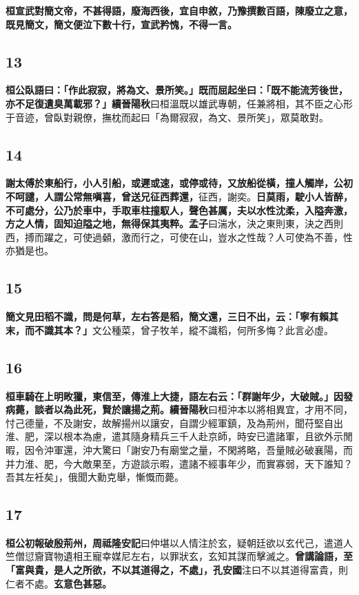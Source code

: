 \textbf{桓宣武對簡文帝，不甚得語，廢海西後，宜自申敘，乃豫撰數百語，陳廢立之意，既見簡文，簡文便泣下數十行，宣武矜愧，不得一言。}

\subsection*{13}

\textbf{桓公臥語曰：「作此寂寂，將為文、景所笑。」既而屈起坐曰：「既不能流芳後世，亦不足復遺臭萬載邪？」}{\footnotesize \textbf{續晉陽秋}曰桓溫既以雄武專朝，任兼將相，其不臣之心形于音迹，曾臥對親僚，撫枕而起曰「為爾寂寂，為文、景所笑」，眾莫敢對。}

\subsection*{14}

\textbf{謝太傅於東船行，小人引船，或遲或速，或停或待，又放船從橫，撞人觸岸，公初不呵譴，人謂公常無嗔喜，曾送兄征西葬還，}{\footnotesize 征西，謝奕。}\textbf{日莫雨，駛小人皆醉，不可處分，公乃於車中，手取車柱撞馭人，聲色甚厲，夫以水性沈柔，入隘奔激，方之人情，固知迫隘之地，無得保其夷粹。}{\footnotesize \textbf{孟子}曰湍水，決之東則東，決之西則西，搏而躍之，可使過顙，激而行之，可使在山，豈水之性哉？人可使為不善，性亦猶是也。}

\subsection*{15}

\textbf{簡文見田稻不識，問是何草，左右答是稻，簡文還，三日不出，云：「寧有賴其末，而不識其本？」}{\footnotesize 文公種菜，曾子牧羊，縱不識稻，何所多悔？此言必虛。}

\subsection*{16}

\textbf{桓車騎在上明畋獵，東信至，傳淮上大捷，語左右云：「群謝年少，大破賊。」因發病薨，談者以為此死，賢於讓揚之荊。}{\footnotesize \textbf{續晉陽秋}曰桓沖本以將相異宜，才用不同，忖己德量，不及謝安，故解揚州以讓安，自謂少經軍鎮，及為荊州，聞苻堅自出淮、肥，深以根本為慮，遣其隨身精兵三千人赴京師，時安已遣諸軍，且欲外示閒暇，因令沖軍還，沖大驚曰「謝安乃有廟堂之量，不閑將略，吾量賊必破襄陽，而并力淮、肥，今大敵果至，方遊談示暇，遣諸不經事年少，而實寡弱，天下誰知？吾其左衽矣」，俄聞大勳克舉，慚慨而薨。}

\subsection*{17}

\textbf{桓公初報破殷荊州，}{\footnotesize \textbf{周祗隆安記}曰仲堪以人情注於玄，疑朝廷欲以玄代己，遣道人竺僧愆齎寶物遺相王寵幸媒尼左右，以罪狀玄，玄知其謀而擊滅之。}\textbf{曾講論語，至「富與貴，是人之所欲，不以其道得之，不處」，}{\footnotesize \textbf{孔安國}注曰不以其道得富貴，則仁者不處。}\textbf{玄意色甚惡。}